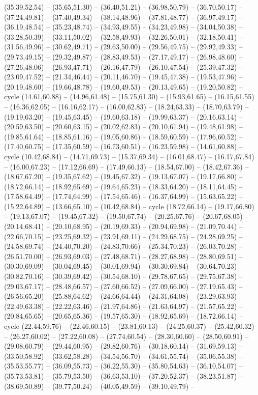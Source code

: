 {(35.39,52.54) -- (35.65,51.30) -- (36.40,51.21) -- (36.98,50.79) -- (36.70,50.17) -- (37.24,49.81) -- (37.40,49.34) -- (38.14,48.96) -- (37.81,48.77) -- (36.97,49.17) -- (36.19,48.54) -- (35.23,48.74) -- (34.93,49.55) -- (34.23,49.98) -- (34.04,50.38) -- (33.28,50.39) -- (33.11,50.02) -- (32.58,49.93) -- (32.26,50.01) -- (32.18,50.41) -- (31.56,49.96) -- (30.62,49.71) -- (29.63,50.00) -- (29.56,49.75) -- (29.92,49.33) -- (29.73,49.15) -- (29.32,49.87) -- (28.83,49.53) -- (27.17,49.17) -- (26.98,48.60) -- (27.26,48.06) -- (26.93,47.71) -- (26.16,47.79) -- (26.10,47.54) -- (25.39,47.32) -- (23.09,47.52) -- (21.34,46.44) -- (20.11,46.70) -- (19.45,47.38) -- (19.53,47.96) -- (20.19,48.60) -- (19.66,48.78) -- (19.60,49.53) -- (20.13,49.65) -- (19.20,50.82) -- cycle (14.61,60.88) -- (14.96,61.48) -- (15.75,61.30) -- (15.93,61.65) -- (16.15,61.55) -- (16.36,62.05) -- (16.16,62.17) -- (16.00,62.83) -- (18.24,63.33) -- (18.70,63.79) -- (19.19,63.20) -- (19.45,63.45) -- (19.60,63.18) -- (19.99,63.37) -- (20.16,63.14) -- (20.59,63.50) -- (20.60,63.15) -- (20.02,62.83) -- (20.10,61.94) -- (19.48,61.98) -- (19.85,61.64) -- (18.85,61.16) -- (19.05,60.86) -- (18.59,60.59) -- (17.96,60.52) -- (17.40,60.75) -- (17.35,60.59) -- (16.73,60.51) -- (16.23,59.98) -- (14.61,60.88) -- cycle (10.42,68.84) -- (14.71,69.73) -- (15.37,69.34) -- (16.01,68.47) -- (16.17,67.84) -- (16.00,67.23) -- (17.12,66.69) -- (17.49,66.13) -- (18.54,67.00) -- (18.42,67.36) -- (18.67,67.20) -- (19.35,67.62) -- (19.45,67.32) -- (19.13,67.07) -- (19.17,66.80) -- (18.72,66.14) -- (18.92,65.69) -- (19.64,65.23) -- (18.33,64.20) -- (18.11,64.45) -- (17.58,64.49) -- (17.74,64.99) -- (17.54,65.46) -- (16.37,64.99) -- (15.63,65.22) -- (15.22,64.89) -- (13.66,65.10) -- (10.42,68.84) -- cycle (18.72,66.14) -- (19.17,66.80) -- (19.13,67.07) -- (19.45,67.32) -- (19.50,67.74) -- (20.25,67.76) -- (20.67,68.05) -- (20.14,68.41) -- (20.10,68.95) -- (20.19,69.33) -- (20.94,69.98) -- (21.09,70.44) -- (22.66,70.15) -- (23.25,69.32) -- (23.91,69.11) -- (24.29,68.75) -- (24.28,69.25) -- (24.58,69.74) -- (24.40,70.20) -- (24.83,70.66) -- (25.34,70.23) -- (26.03,70.28) -- (26.51,70.00) -- (26.93,69.03) -- (27.48,68.71) -- (28.27,68.98) -- (28.80,69.51) -- (30.30,69.09) -- (30.04,69.45) -- (30.01,69.94) -- (30.30,69.84) -- (30.64,70.23) -- (30.82,70.16) -- (30.39,69.42) -- (30.54,68.10) -- (29.78,67.65) -- (29.75,67.38) -- (29.03,67.17) -- (28.48,66.57) -- (27.60,66.52) -- (27.09,66.00) -- (27.19,65.43) -- (26.56,65.20) -- (25.88,64.62) -- (24.66,64.44) -- (24.31,64.08) -- (23.29,63.93) -- (22.49,63.38) -- (22.22,63.46) -- (21.97,64.86) -- (21.63,64.97) -- (21.57,65.22) -- (20.84,65.65) -- (20.65,65.36) -- (19.57,65.30) -- (18.92,65.69) -- (18.72,66.14) -- cycle (22.44,59.76) -- (22.46,60.15) -- (23.81,60.13) -- (24.25,60.37) -- (25.42,60.32) -- (26.27,60.02) -- (27.22,60.08) -- (27.74,60.54) -- (28.30,60.60) -- (28.50,60.91) -- (29.08,60.79) -- (29.44,60.95) -- (29.82,60.76) -- (30.18,60.14) -- (31.69,59.13) -- (33.50,58.92) -- (33.62,58.28) -- (34.54,56.70) -- (34.61,55.74) -- (35.06,55.38) -- (35.53,55.77) -- (36.09,55.73) -- (36.22,55.30) -- (35.80,54.63) -- (36.10,54.07) -- (35.73,53.81) -- (35.79,53.50) -- (36.63,53.10) -- (37.20,52.37) -- (38.23,51.87) -- (38.69,50.89) -- (39.77,50.24) -- (40.05,49.59) -- (39.10,49.79) -- }
